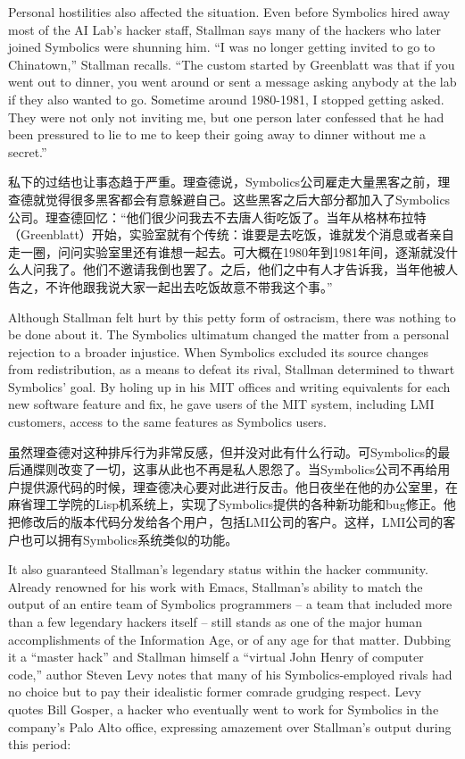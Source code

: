 \ifdefined\eng
Personal hostilities also affected the situation.   Even before Symbolics hired away most of the AI Lab's hacker staff, Stallman says many of the hackers who later joined Symbolics were shunning him. ``I was no longer getting invited to go to Chinatown,'' Stallman recalls. ``The custom started by Greenblatt was that if you went out to dinner, you went around or sent a message asking anybody at the lab if they also wanted to go. Sometime around 1980-1981, I stopped getting asked. They were not only not inviting me, but one person later confessed that he had been pressured to lie to me to keep their going away to dinner without me a secret.''
\fi

\ifdefined\chs
私下的过结也让事态趋于严重。理查德说，Symbolics公司雇走大量黑客之前，理查德就觉得很多黑客都会有意躲避自己。这些黑客之后大部分都加入了Symbolics公司。理查德回忆：``他们很少问我去不去唐人街吃饭了。当年从格林布拉特（Greenblatt）开始，实验室就有个传统：谁要是去吃饭，谁就发个消息或者亲自走一圈，问问实验室里还有谁想一起去。可大概在1980年到1981年间，逐渐就没什么人问我了。他们不邀请我倒也罢了。之后，他们之中有人才告诉我，当年他被人告之，不许他跟我说大家一起出去吃饭故意不带我这个事。''
\fi

\ifdefined\eng
Although Stallman felt hurt by this petty form of ostracism, there was nothing to be done about it.  The Symbolics ultimatum changed the matter from a personal rejection to a broader injustice. When Symbolics excluded its source changes from redistribution, as a means to defeat its rival, Stallman determined to thwart Symbolics' goal. By holing up in his MIT offices and writing equivalents for each new software feature and fix, he gave users of the MIT system, including LMI customers, access to the same features as Symbolics users.
\fi

\ifdefined\chs
虽然理查德对这种排斥行为非常反感，但并没对此有什么行动。可Symbolics的最后通牒则改变了一切，这事从此也不再是私人恩怨了。当Symbolics公司不再给用户提供源代码的时候，理查德决心要对此进行反击。他日夜坐在他的办公室里，在麻省理工学院的Lisp机系统上，实现了Symbolics提供的各种新功能和bug修正。他把修改后的版本代码分发给各个用户，包括LMI公司的客户。这样，LMI公司的客户也可以拥有Symbolics系统类似的功能。
\fi

\ifdefined\eng
It also guaranteed Stallman's legendary status within the hacker community. Already renowned for his work with Emacs, Stallman's ability to match the output of an entire team of Symbolics programmers -- a team that included more than a few legendary hackers itself -- still stands as one of the major human accomplishments of the Information Age, or of any age for that matter. Dubbing it a ``master hack'' and Stallman himself a ``virtual John Henry of computer code,'' author Steven Levy notes that many of his Symbolics-employed rivals had no choice but to pay their idealistic former comrade grudging respect. Levy quotes Bill Gosper, a hacker who eventually went to work for Symbolics in the company's Palo Alto office, expressing amazement over Stallman's output during this period:
\fi

